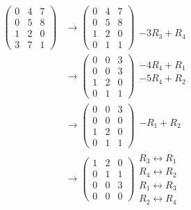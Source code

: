 \documentclass[12pt]{article}
\newenvironment{problem}[2][Problem]
{
	\begin{trivlist} 
		\item[\hskip \labelsep {\bfseries #1 #2:}]
	}
{
	\end{trivlist}
	}
\newenvironment{solution}[1][Solution]
{
	\begin{trivlist} 
		\item[\hskip \labelsep {\itshape #1:}]
	}
	{
	\end{trivlist}
}
\begin{document}
\begin{problem}{1}
\begin{solution}
\begin{align*}
\begin{pmatrix} 0&4&7\\0&5&8\\1&2&0\\3&7&1 \end{pmatrix} &\rightarrow \begin{pmatrix} 0&4&7\\0&5&8\\1&2&0\\0&1&1 \end{pmatrix} \begin{matrix} \text{ } \\ \text{ } \\ \text{ } \\ -3R_3+R_4\text{ } \end{matrix} \\
%
%
%
&\rightarrow \begin{pmatrix} 0&0&3\\0&0&3\\1&2&0\\0&1&1 \end{pmatrix} \begin{matrix} -4R_4+R_1\text{ } \\ -5R_4+R_2\text{ } \\ \text{ } \\ \text{ } \end{matrix} \\
%
%
%
&\rightarrow \begin{pmatrix} 0&0&3\\0&0&0\\1&2&0\\0&1&1 \end{pmatrix} \begin{matrix} \text{ } \\ -R_1+R_2\text{ } \\ \text{ } \\ \text{ } \end{matrix} \\
%
%
%
&\rightarrow \begin{pmatrix} 1&2&0\\0&1&1\\0&0&3\\0&0&0 \end{pmatrix} \begin{matrix} R_3 \leftrightarrow R_1 \text{ } \\ R_4 \leftrightarrow R_2 \text{ } \\ R_1 \leftrightarrow R_3 \text{ } \\ R_2 \leftrightarrow R_4 \text{ } \end{matrix} \\

\end{align*}
\end{solution}
\end{problem}
\end{document}
